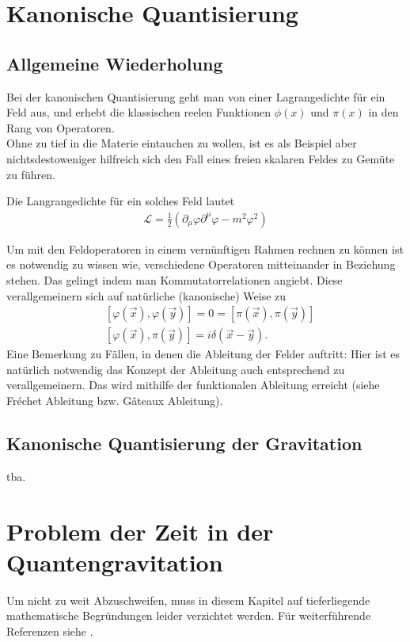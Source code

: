 \documentclass{scrartcl}
\begin{document}
	\section{Kanonische Quantisierung}
	\subsection{Allgemeine Wiederholung}
		Bei der kanonischen Quantisierung geht man von einer Lagrangedichte für ein 
		Feld aus, und erhebt die klassischen reelen Funktionen $\phi(x)$ und $\pi(x)$ in
		den Rang von Operatoren.\\
		Ohne zu tief in die Materie eintauchen zu wollen, ist es als Beispiel aber nichtsdestoweniger
		hilfreich sich den Fall eines freien skalaren Feldes zu Gemüte zu führen.
		
		Die Langrangedichte für ein solches Feld lautet
		\begin{align}
			\mathcal{L}=\frac{1}{2}(\partial_\mu\varphi \partial^\mu\varphi-m^2\varphi^2)
		\end{align}
		
		Um mit den Feldoperatoren in einem vernünftigen Rahmen rechnen zu können
		ist es notwendig zu wissen wie, verschiedene Operatoren mitteinander in 
		Beziehung stehen. Das gelingt indem man Kommutatorrelationen angiebt.
		Diese verallgemeinern sich auf natürliche (kanonische) Weise zu
		\begin{align}
			&[\varphi(\vec{x}), \varphi(\vec{y})]=0=[\pi(\vec{x}), \pi(\vec{y})] \\
			&[\varphi(\vec{x}), \pi(\vec{y})]=i\delta(\vec{x}-\vec{y}).
		\end{align}
		Eine Bemerkung zu Fällen, in denen die Ableitung der Felder auftritt:
		Hier ist es natürlich notwendig das Konzept der Ableitung auch entsprechend
		zu verallgemeinern. Das wird mithilfe der funktionalen Ableitung erreicht
		(siehe Fr\'echet Ableitung bzw. G\^ateaux Ableitung).
	\subsection{Kanonische Quantisierung der Gravitation}
		tba. %
	\section{Problem der Zeit in der Quantengravitation}
		Um nicht zu weit Abzuschweifen, muss in diesem Kapitel auf tieferliegende
		mathematische Begründungen leider verzichtet werden. Für weiterführende Referenzen
		siehe \cite{qg06,gr-qc/9210011}.
		
\end{document}
